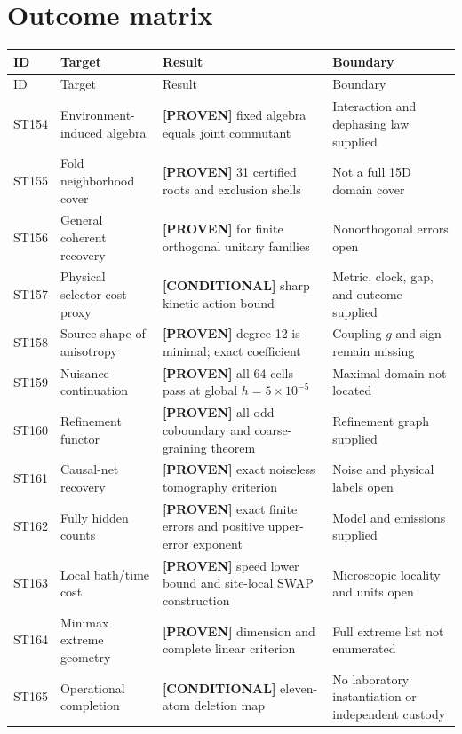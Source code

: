 \documentclass[11pt,a4paper]{article}
\newcommand{\proven}{\textcolor{green!40!black}{\textbf{[PROVEN]}}}
\newcommand{\conditional}{\textcolor{violet!65!black}{\textbf{[CONDITIONAL]}}}
\begin{document}
\section{Outcome matrix}
\small
\begin{longtable}{@{}p{}p{}p{}p{}@{}}
\toprule ID & Target & Result & Boundary\\\midrule\endfirsthead
\toprule ID & Target & Result & Boundary\\\midrule\endhead
ST154 & Environment-induced algebra & \proven{} fixed algebra equals joint commutant & Interaction and dephasing law supplied\\
ST155 & Fold neighborhood cover & \proven{} 31 certified roots and exclusion shells & Not a full 15D domain cover\\
ST156 & General coherent recovery & \proven{} for finite orthogonal unitary families & Nonorthogonal errors open\\
ST157 & Physical selector cost proxy & \conditional{} sharp kinetic action bound & Metric, clock, gap, and outcome supplied\\
ST158 & Source shape of anisotropy & \proven{} degree 12 is minimal; exact coefficient & Coupling $g$ and sign remain missing\\
ST159 & Nuisance continuation & \proven{} all 64 cells pass at global $h=5\times10^{-5}$ & Maximal domain not located\\
ST160 & Refinement functor & \proven{} all-odd coboundary and coarse-graining theorem & Refinement graph supplied\\
ST161 & Causal-net recovery & \proven{} exact noiseless tomography criterion & Noise and physical labels open\\
ST162 & Fully hidden counts & \proven{} exact finite errors and positive upper-error exponent & Model and emissions supplied\\
ST163 & Local bath/time cost & \proven{} speed lower bound and site-local SWAP construction & Microscopic locality and units open\\
ST164 & Minimax extreme geometry & \proven{} dimension and complete linear criterion & Full extreme list not enumerated\\
ST165 & Operational completion & \conditional{} eleven-atom deletion map & No laboratory instantiation or independent custody\\
\bottomrule
\end{longtable}
\normalsize
\end{document}
